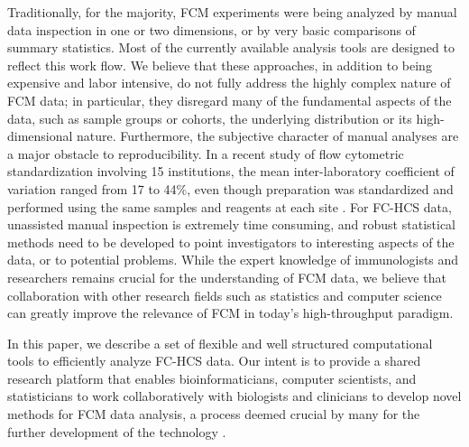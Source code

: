 \documentclass[10pt]{bmc_article}
\newenvironment{bmcformat}{\begin{raggedright}\baselineskip20pt\sloppy\setboolean{publ}{false}}{\end{raggedright}\baselineskip20pt\sloppy}
\begin{document}
\begin{bmcformat}
Traditionally, for the majority, FCM experiments were being analyzed
by manual data inspection in one or two dimensions, or by very basic
comparisons of summary statistics. Most of the currently available
analysis tools are designed to reflect this work flow.  We believe
that these approaches, in addition to being expensive and labor
intensive, do not fully address the highly complex nature of FCM data;
in particular, they disregard many of the fundamental aspects of the
data, such as sample groups or cohorts, the underlying distribution or
its high-dimensional nature. Furthermore, the subjective character of
manual analyses are a major obstacle to reproducibility. In a recent
study of flow cytometric standardization involving 15 institutions,
the mean inter-laboratory coefficient of variation ranged from 17 to
44\%, even though preparation was standardized and performed using the
same samples and reagents at each site \cite{Maecker2005}. For FC-HCS
data, unassisted manual inspection is extremely time consuming, and
robust statistical methods need to be developed to point investigators
to interesting aspects of the data, or to potential problems. While
the expert knowledge of immunologists and researchers remains crucial
for the understanding of FCM data, we believe that collaboration with
other research fields such as statistics and computer science can
greatly improve the relevance of FCM in today's high-throughput
paradigm.

In this paper, we describe a set of flexible and well structured
computational tools to efficiently analyze FC-HCS data. Our intent is
to provide a shared research platform that enables bioinformaticians,
computer scientists, and statisticians to work collaboratively with
biologists and clinicians to develop novel methods for FCM data
analysis, a process deemed crucial by many for the further development
of the technology \cite{lizard2007fca}.

 

\end{bmcformat}
\end{document}

